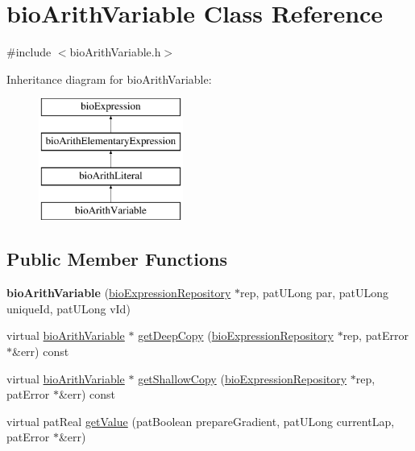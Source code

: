 \hypertarget{classbio_arith_variable}{}\section{bio\+Arith\+Variable Class Reference}
\label{classbio_arith_variable}


{\ttfamily \#include $<$bio\+Arith\+Variable.\+h$>$}

Inheritance diagram for bio\+Arith\+Variable\+:\begin{figure}[H]
\begin{center}
\leavevmode
\includegraphics[height=4.000000cm]{classbio_arith_variable}
\end{center}
\end{figure}
\subsection*{Public Member Functions}
\begin{DoxyCompactItemize}
\item 
\mbox{\label{classbio_arith_variable_aea4a29d0ed4f912e08020ba89356ab81}} 
{\bfseries bio\+Arith\+Variable} (\hyperlink{classbio_expression_repository}{bio\+Expression\+Repository} $\ast$rep, pat\+U\+Long par, pat\+U\+Long unique\+Id, pat\+U\+Long v\+Id)
\item 
virtual \hyperlink{classbio_arith_variable}{bio\+Arith\+Variable} $\ast$ \hyperlink{classbio_arith_variable_a13698945a07c98905254d7e773555de3}{get\+Deep\+Copy} (\hyperlink{classbio_expression_repository}{bio\+Expression\+Repository} $\ast$rep, pat\+Error $\ast$\&err) const
\item 
virtual \hyperlink{classbio_arith_variable}{bio\+Arith\+Variable} $\ast$ \hyperlink{classbio_arith_variable_a5b2185aabcab07bcd474479f8ca7dd94}{get\+Shallow\+Copy} (\hyperlink{classbio_expression_repository}{bio\+Expression\+Repository} $\ast$rep, pat\+Error $\ast$\&err) const
\item 
virtual pat\+Real \hyperlink{classbio_arith_variable_a49717d281e84536b65a715918fdfc4c5}{get\+Value} (pat\+Boolean prepare\+Gradient, pat\+U\+Long current\+Lap, pat\+Error $\ast$\&err)
\end{DoxyCompactItemize}

